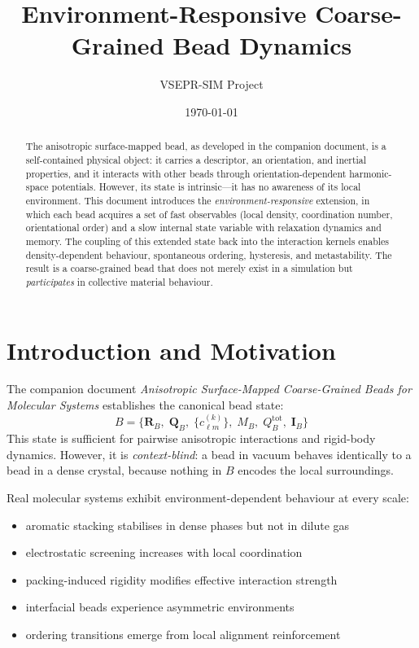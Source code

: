 \documentclass[11pt]{article}
\title{Environment-Responsive Coarse-Grained Bead Dynamics}
\author{VSEPR-SIM Project}
\date{\today}
\begin{document}
\maketitle

\begin{abstract}
The anisotropic surface-mapped bead, as developed in the companion document,
is a self-contained physical object: it carries a descriptor, an orientation,
and inertial properties, and it interacts with other beads through
orientation-dependent harmonic-space potentials.  However, its state is
intrinsic---it has no awareness of its local environment.  This document
introduces the \emph{environment-responsive} extension, in which each bead
acquires a set of fast observables (local density, coordination number,
orientational order) and a slow internal state variable with relaxation
dynamics and memory.  The coupling of this extended state back into the
interaction kernels enables density-dependent behaviour, spontaneous
ordering, hysteresis, and metastability.  The result is a coarse-grained
bead that does not merely exist in a simulation but \emph{participates} in
collective material behaviour.
\end{abstract}

\section{Introduction and Motivation}

The companion document \emph{Anisotropic Surface-Mapped Coarse-Grained
Beads for Molecular Systems} establishes the canonical bead state:
\begin{equation}
    B = \bigl\{
        \mathbf{R}_B,\;
        \mathbf{Q}_B,\;
        \{c_{\ell m}^{(k)}\},\;
        M_B,\;
        Q_B^{\mathrm{tot}},\;
        \mathbf{I}_B
    \bigr\}
\end{equation}
This state is sufficient for pairwise anisotropic interactions and
rigid-body dynamics.  However, it is \emph{context-blind}: a bead in vacuum
behaves identically to a bead in a dense crystal, because nothing in $B$
encodes the local surroundings.

Real molecular systems exhibit environment-dependent behaviour at every
scale:
\begin{itemize}
    \item aromatic stacking stabilises in dense phases but not in dilute gas
    \item electrostatic screening increases with local coordination
    \item packing-induced rigidity modifies effective interaction strength
    \item interfacial beads experience asymmetric environments
    \item ordering transitions emerge from local alignment reinforcement
\end{itemize}
\end{document}
